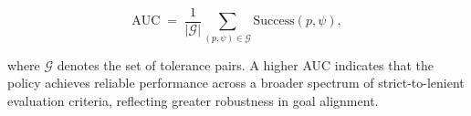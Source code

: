 \[
\mathrm{AUC} \;=\; \frac{1}{|\mathcal{G}|}\sum_{(p,\psi)\in\mathcal{G}} \mathrm{Success}(p,\psi),
\]

where $\mathcal{G}$ denotes the set of tolerance pairs. A higher AUC indicates that the policy achieves reliable performance across a broader spectrum of strict-to-lenient evaluation criteria, reflecting greater robustness in goal alignment.